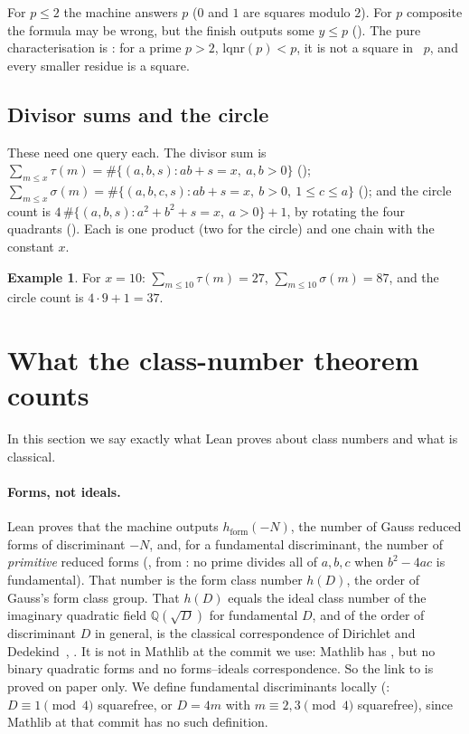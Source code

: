 \documentclass[10pt]{amsart}
\theoremstyle{plain}
\theoremstyle{definition}
\newtheorem{example}[theorem]{Example}
\theoremstyle{remark}
\numberwithin{equation}{section}
\newcommand{\hF}{h_{\mathrm{form}}}
\begin{document}
\noindent For $p\le2$ the machine answers $p$ ($0$ and $1$ are squares modulo $2$). For $p$ composite the
formula may be wrong, but the finish outputs some $y\le p$ (). The pure
characterisation is : for a prime $p>2$, $\mathrm{lqnr}(p)<p$, it is not a square in
~$p$, and every smaller residue is a square.

\subsection{Divisor sums and the circle}\label{sec:lattice}
These need one query each. The divisor sum is $\sum_{m\le x}\tau(m)=\#\{(a,b,s):ab+s=x,\ a,b>0\}$
(); $\sum_{m\le x}\sigma(m)=\#\{(a,b,c,s):ab+s=x,\ b>0,\ 1\le c\le a\}$ (); and the
circle count is $4\,\#\{(a,b,s):a^2+b^2+s=x,\ a>0\}+1$, by rotating the four quadrants
(). Each is one product (two for the circle) and one chain with the constant $x$.

\begin{example}\label{ex:lattice}
For $x=10$: $\sum_{m\le10}\tau(m)=27$, $\sum_{m\le10}\sigma(m)=87$, and the circle count is $4\cdot9+1=37$.
\end{example}

\section{What the class-number theorem counts}\label{sec:honesty}

In this section we say exactly what Lean proves about class numbers and what is classical.

\paragraph{Forms, not ideals.} Lean proves that the machine outputs $\hF(-N)$, the number of Gauss reduced
forms of discriminant $-N$, and, for a fundamental discriminant, the number of \emph{primitive} reduced forms
(, from : no prime divides all of $a,b,c$ when
$b^2-4ac$ is fundamental). That number is the form class number $h(D)$, the order of Gauss's form class
group. That $h(D)$ equals the ideal class number of the imaginary quadratic field $\mathbb{Q}(\sqrt D)$
for fundamental $D$, and of the order of discriminant $D$ in general, is the classical correspondence of
Dirichlet and Dedekind~\cite[Thm.~7.7]{Cox13}, \cite{Bue89}. It is not in Mathlib at the commit we use:
Mathlib has , but no binary quadratic forms and no forms--ideals
correspondence. So the link to  is proved on paper only. We define
fundamental discriminants locally (: $D\equiv1\pmod 4$ squarefree, or $D=4m$ with
$m\equiv2,3\pmod4$ squarefree), since Mathlib at that commit has no such definition.
\end{document}
